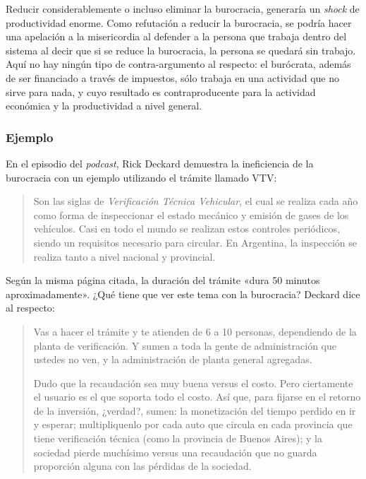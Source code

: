 \documentclass[12pt,a4paper,twoside]{book}
\begin{document}
Reducir considerablemente o incluso eliminar la burocracia, generaría un \textit{shock} de productividad enorme. Como refutación a reducir la burocracia, se podría hacer una apelación a la misericordia al defender a la persona que trabaja dentro del sistema al decir que si se reduce la burocracia, la persona se quedará sin trabajo. Aquí no hay ningún tipo de contra-argumento al respecto: el burócrata, además de ser financiado a través de impuestos, sólo trabaja en una actividad que no sirve para nada, y cuyo resultado es contraproducente para la actividad económica y la productividad a nivel general.

\subsubsection{Ejemplo}
En el episodio del \textit{podcast}, Rick Deckard demuestra la ineficiencia de la burocracia con un ejemplo utilizando el trámite llamado VTV:

\begin{quotation}
Son las siglas de \textit{Verificación Técnica Vehicular}, el cual se realiza cada año como forma de inspeccionar el estado mecánico y emisión de gases de los vehículos. Casi en todo el mundo se realizan estos controles periódicos, siendo un requisitos necesario para circular. En Argentina, la inspección se realiza tanto a nivel nacional y provincial. \cite{vtv}
\end{quotation}

Según la misma página citada, la duración del trámite «dura 50 minutos aproximadamente». ¿Qué tiene que ver este tema con la burocracia? Deckard dice al respecto:

\begin{quotation}
Vas a hacer el trámite y te atienden de 6 a 10 personas, dependiendo de la planta de verificación. Y sumen a toda la gente de administración que ustedes no ven, y la administración de planta general agregadas.

Dudo que la recaudación sea muy buena versus el costo. Pero ciertamente el usuario es el que soporta todo el costo. Así que, para fijarse en el retorno de la inversión, ¿verdad?, sumen: la monetización del tiempo perdido en ir y esperar; multipliquenlo por cada auto que circula en cada provincia que tiene verificación técnica (como la provincia de Buenos Aires); y la sociedad pierde muchísimo versus una recaudación que no guarda proporción alguna con las pérdidas de la sociedad. \cite[CT: 5:50-6:33]{rompiendolabanca:burocracia}
\end{quotation}
\end{document}
